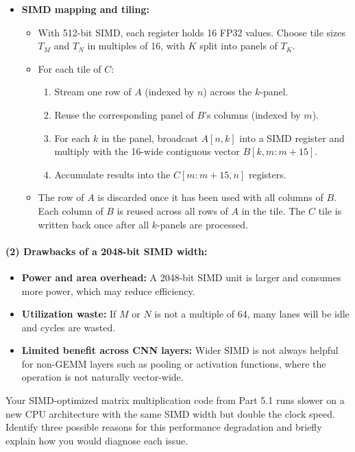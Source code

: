 \documentclass[a4 paper]{article}
\begin{document}
\begin{itemize}
  \item \textbf{SIMD mapping and tiling:}
  \begin{itemize}
    \item With 512-bit SIMD, each register holds 16 FP32 values. Choose tile sizes $T_M$ and $T_N$ in multiples of 16, with $K$ split into panels of $T_K$.
    \item For each tile of $C$:
      \begin{enumerate}
        \item Stream one row of $A$ (indexed by $n$) across the $k$-panel.
        \item Reuse the corresponding panel of $B$’s columns (indexed by $m$).
        \item For each $k$ in the panel, broadcast $A[n,k]$ into a SIMD register and multiply with the 16-wide contiguous vector $B[k, m:m+15]$.
        \item Accumulate results into the $C[m:m+15,n]$ registers.
      \end{enumerate}
    \item The row of $A$ is discarded once it has been used with all columns of $B$. Each column of $B$ is reused across all rows of $A$ in the tile. The $C$ tile is written back once after all $k$-panels are processed.
  \end{itemize}
\end{itemize}

\paragraph{(2) Drawbacks of a 2048-bit SIMD width:}
\begin{itemize}
  \item \textbf{Power and area overhead:} A 2048-bit SIMD unit is larger and consumes more power, which may reduce efficiency.
  \item \textbf{Utilization waste:} If $M$ or $N$ is not a multiple of 64, many lanes will be idle and cycles are wasted.
  \item \textbf{Limited benefit across CNN layers:} Wider SIMD is not always helpful for non-GEMM layers such as pooling or activation functions, where the operation is not naturally vector-wide.
\end{itemize}



Your SIMD-optimized matrix multiplication code from Part 5.1 runs slower on a new CPU architecture with the same SIMD width but double the clock speed. Identify three possible reasons for this performance degradation and briefly explain how you would diagnose each issue.
\end{document}
